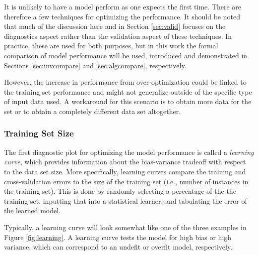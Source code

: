 It is unlikely to have a model perform as one expects the first time. There are
therefore a few techniques for optimizing the performance. It should be noted
that much of the discussion here and in Section \ref{sec:valid} focuses on
the diagnostics aspect rather than the validation aspect of these techniques.
In practice, these are used for both purposes, but in this work the formal
comparison of model performance will be used, introduced and demonstrated in
Sections \ref{sec:invcompare} and \ref{sec:algcompare}, respectively. 

However, the increase in performance from over-optimization could be linked to
the training set performance and might not generalize outside of the specific
type of input data used.  A workaround for this scenario is to obtain more data
for the set or to obtain a completely different data set altogether. 

\subsubsection{Training Set Size}

The first diagnostic plot for optimizing the model performance is called a
\textit{learning curve}, which provides information about the bias-variance
tradeoff with respect to the data set size. More specifically, learning curves
compare the training and cross-validation errors to the size of the training
set (i.e., number of instances in the training set). This is done by randomly
selecting a percentage of the the training set, inputting that into a
statistical learner, and tabulating the error of the learned model. 

Typically, a learning curve will look somewhat like one of the three examples
in Figure \ref{fig:learning}.  A learning curve tests the model for high bias
or high variance, which can correspond to an undefit or overfit model,
respectively. 

